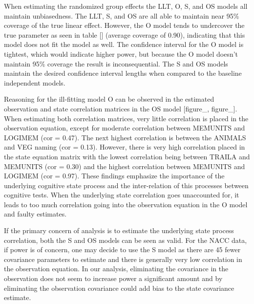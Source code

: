 \documentclass[
]{article}
\begin{document}
When estimating the randomized group effects the LLT, O, S, and OS models all maintain unbiasedness. The LLT, S, and OS are all able to maintain near 95\% coverage of the true linear effect. However, the O model tends to undercover the true parameter as seen in table {[}{]} (average coverage of 0.90), indicating that this model does not fit the model as well. The confidence interval for the O model is tightest, which would indicate higher power, but because the O model doesn't maintain 95\% coverage the result is inconsequential. The S and OS models maintain the desired confidence interval lengths when compared to the baseline independent models.

Reasoning for the ill-fitting model O can be observed in the estimated observation and state correlation matrices in the OS model {[}figure\_, figure\_{]}. When estimating both correlation matrices, very little correlation is placed in the observation equation, except for moderate correlation between MEMUNITS and LOGIMEM (cor = 0.47). The next highest correlation is between the ANIMALS and VEG naming (cor = 0.13). However, there is very high correlation placed in the state equation matrix with the lowest correlation being between TRAILA and MEMUNITS (cor = 0.30) and the highest correlation between MEMUNITS and LOGIMEM (cor = 0.97). These findings emphasize the importance of the underlying cognitive state process and the inter-relation of this processes between cognitive tests. When the underlying state correlation goes unaccounted for, it leads to too much correlation going into the observation equation in the O model and faulty estimates.

If the primary concern of analysis is to estimate the underlying state process correlation, both the S and OS models can be seen as valid. For the NACC data, if power is of concern, one may decide to use the S model as there are 45 fewer covariance parameters to estimate and there is generally very low correlation in the observation equation. In our analysis, eliminating the covariance in the observation does not seem to increase power a significant amount and by eliminating the observation covariance could add bias to the state covariance estimate.
\end{document}
